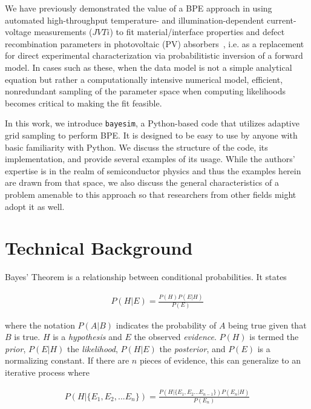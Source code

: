 \documentclass[aps,prl,amsmath,amssymb,superscriptaddress,notitlepage,groupedaddress]{revtex4-1}
\begin{document}
  We have previously demonstrated the value of a BPE approach in using automated high-throughput temperature- and illumination-dependent current-voltage measurements ($JVTi$) to fit material/interface properties and defect recombination parameters in photovoltaic (PV) absorbers~\cite{SnSJoule,FeBayes}, i.e. as a replacement for direct experimental characterization via probabilitistic inversion of a forward model. In cases such as these, when the data model is not a simple analytical equation but rather a computationally intensive numerical model, efficient, nonredundant sampling of the parameter space when computing likelihoods becomes critical to making the fit feasible.

  In this work, we introduce \texttt{bayesim}, a Python-based code that utilizes adaptive grid sampling to perform BPE. It is designed to be easy to use by anyone with basic familiarity with Python. We discuss the structure of the code, its implementation, and provide several examples of its usage. While the authors' expertise is in the realm of semiconductor physics and thus the examples herein are drawn from that space, we also discuss the general characteristics of a problem amenable to this approach so that researchers from other fields might adopt it as well.

\section*{Technical Background}

 Bayes' Theorem is a relationship between conditional probabilities. It states

 \begin{equation}
   \begin{split}
     \label{Eq:1001}
     P(H|E)=\frac{P(H)P(E|H)}{P(E)}
   \end{split}
 \end{equation}

 where the notation $P(A|B)$ indicates the probability of $A$ being true given that $B$ is true. $H$ is a \textit{hypothesis} and $E$ the observed \textit{evidence}. $P(H)$ is termed the \textit{prior}, $P(E|H)$ the \textit{likelihood}, $P(H|E)$ the \textit{posterior}, and $P(E)$ is a normalizing constant. If there are $n$ pieces of evidence, this can generalize to an iterative process where

 \begin{equation}
   \begin{split}
     \label{Eq:2}
     P(H|\{E_1,E_2,...E_n\}) = \frac{P(H|\{E_1,E_2...E_{n-1}\})P(E_n|H)}{P(E_n)}
   \end{split}
 \end{equation}
\end{document}
